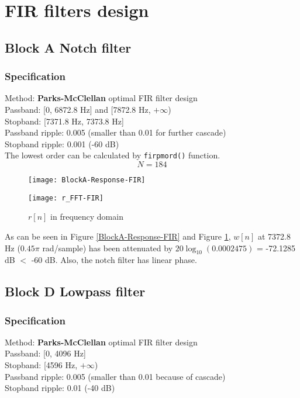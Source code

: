 \documentclass{article}
\newenvironment{homeworkProblem}[1]{
	\section{#1}
	}{
}
\newenvironment{homeworkSection}[1]{
	\subsection{#1}
	}{
}
\begin{document}
\begin{homeworkProblem}{FIR filters design}


\begin{homeworkSection}{Block A Notch filter}

\subsubsection{Specification}
Method: \textbf{Parks-McClellan} optimal FIR filter design\\
Passband: [0, 6872.8 Hz] and [7872.8 Hz, $+\infty$)\\
Stopband: [7371.8 Hz, 7373.8 Hz]\\
Passband ripple: 0.005 (smaller than 0.01 for further cascade)\\
Stopband ripple: 0.001 (-60 dB)\\

The lowest order can be calculated by \texttt{firpmord()} function.
\begin{equation}
N = 184
\end{equation}

\begin{figure}[H]
\begin{minipage}[t]{0.5\linewidth}
\centering
\texttt{[image: BlockA-Response-FIR]}
\caption{Block A response}
\label{BlockA-Response-FIR}
\end{minipage}
\begin{minipage}[t]{0.5\linewidth}
\centering
\texttt{[image: r\_FFT-FIR]}
\caption{$r[n]$ in frequency domain}
\label{r_FFT-FIR}
\end{minipage}
\end{figure}

As can be seen in Figure \ref{BlockA-Response-FIR} and Figure \ref{r_FFT-FIR}, $w[n]$ at 7372.8 Hz ($0.45\pi$ rad/sample) has been attenuated by $20 \log_{10}(0.0002475)$ = -72.1285 dB $<$ -60 dB. Also, the notch filter has linear phase.

\end{homeworkSection}


\begin{homeworkSection}{Block D Lowpass filter}

\subsubsection{Specification}
Method: \textbf{Parks-McClellan} optimal FIR filter design\\
Passband: [0, 4096 Hz]\\
Stopband: [4596 Hz, $+\infty$)\\
Passband ripple: 0.005 (smaller than 0.01 because of cascade)\\
Stopband ripple: 0.01 (-40 dB)\\


\end{homeworkSection}
\end{homeworkProblem}
\end{document}
